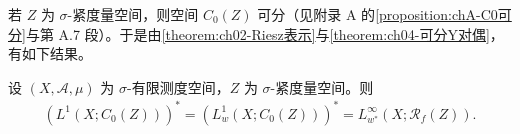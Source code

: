 \documentclass[../../main.tex]{subfiles}%
\begin{document}
若 $Z$ 为 $\sigma$-紧度量空间，则空间 $C_0(Z)$ 可分（见附录 A 的\cref{proposition:chA-C0可分}与第 A.7 段）。于是由\cref{theorem:ch02-Riesz表示}与\cref{theorem:ch04-可分Y对偶}，有如下结果。

\begin{proposition}\label{proposition:ch04-C0对偶}
设 $(X,\mathcal{A},\mu)$ 为 $\sigma$-有限测度空间，$Z$ 为 $\sigma$-紧度量空间。则
\begin{align}
(L^1(X;C_0(Z)))^*=(L^1_w(X;C_0(Z)))^*=L^\infty_{w^*}(X;\mathscr{R}_f(Z)). \label{align:ch04-4.117}
\end{align}
\end{proposition}
\end{document}
